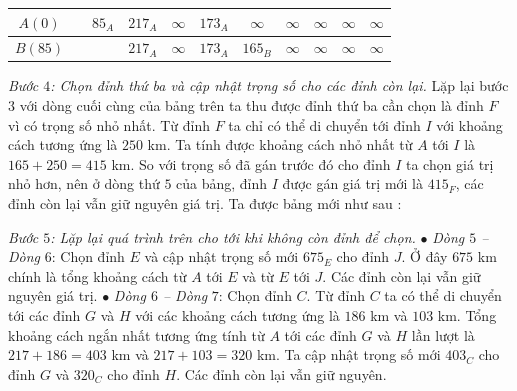 \begin{multicols}{2}
\begin{table}[H]
{\begin{tabular}{|c|c|c|c|c|c|c|c|c|c|c|}
			\hline
			$A(0)$&		&$85_A$	&$217_A$&	$\infty$	&$173_A$&	$\infty$&	$\infty$&	$\infty$&	$\infty$&	$\infty$\\
			\hline
			$B(85)$	&	&	&$217_A$&	$\infty$&	$173_A$&	$165_B$&	$\infty$	&$\infty$&	$\infty$	&$\infty$\\
			\hline
		\end{tabular}}
		\vspace*{-10pt}
	\end{table}
	\textit{Bước $4$: Chọn đỉnh thứ ba và cập nhật trọng số cho các đỉnh còn lại.}  Lặp lại bước $3$ với dòng cuối cùng của bảng trên ta thu được đỉnh thứ ba cần chọn là đỉnh $F$ vì có trọng số nhỏ nhất. Từ đỉnh $F$ ta chỉ có thể di chuyển tới đỉnh $I$ với khoảng cách tương ứng là $250$ km. Ta tính được khoảng cách nhỏ nhất từ $A$ tới $I$ là $165+250=415$ km. So với trọng số đã gán trước đó cho đỉnh $I$ ta chọn giá trị nhỏ hơn, nên ở dòng thứ $5$ của bảng, đỉnh $I$ được gán giá trị mới là $415_F$, các đỉnh còn lại vẫn giữ nguyên giá trị. 
	\vskip 0.1cm
	Ta được bảng mới như sau : 
	\begin{table}[H]
		\vspace*{-5pt}
		\centering
		\captionsetup{labelformat= empty, justification=centering}
		\vspace*{-10pt}
	\end{table}
	\textit{Bước $5$: Lặp lại quá trình trên cho tới khi không còn đỉnh để chọn.}
	\vskip 0.1cm 
	$\bullet$ \textit{Dòng $5$ -- Dòng} $6$: Chọn đỉnh $E$ và cập nhật trọng số mới $675_E$ cho đỉnh $J$. Ở đây $675$ km chính là tổng khoảng cách từ $A$ tới $E$ và từ $E$ tới $J$. Các đỉnh còn lại vẫn giữ nguyên giá trị.
	\vskip 0.1cm 
	$\bullet$ \textit{Dòng $6$ -- Dòng} $7$: Chọn đỉnh $C$. Từ đỉnh $C$ ta có thể di chuyển tới các đỉnh $G$ và $H$ với các khoảng cách tương ứng là $186$ km và $103$ km. Tổng khoảng cách ngắn nhất tương ứng tính từ $A$ tới các đỉnh $G$ và $H$ lần lượt là $217+186=403$ km và $217+103=320$ km. Ta cập nhật trọng số mới $403_C$ cho đỉnh $G$ và $320_C$ cho đỉnh $H$. Các đỉnh còn lại vẫn giữ nguyên. 

\end{multicols}
